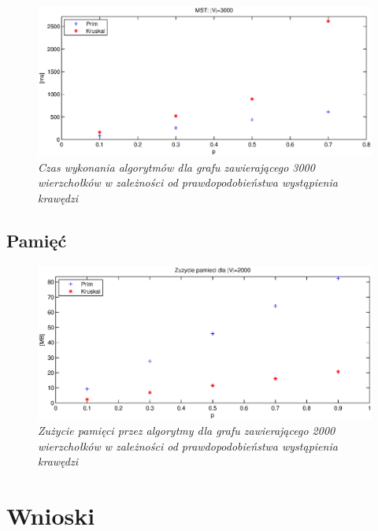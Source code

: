 \documentclass[a4paper, 10pt]{article}
\begin{document}
\begin{figure}[ht!]
\centering
\includegraphics[width=165mm]{wykresy/v3000.eps}
\caption{\it{Czas wykonania algorytmów dla grafu zawierającego 3000 wierzchołków w zależności od prawdopodobieństwa wystąpienia krawędzi}}
\label{overflow}
\end{figure}
\FloatBarrier

\subsection{Pamięć}

\begin{figure}[ht!]
\centering
\includegraphics[width=165mm]{wykresy/mem.eps}
\caption{\it{Zużycie pamięci przez algorytmy dla grafu zawierającego 2000 wierzchołków w zależności od prawdopodobieństwa wystąpienia krawędzi}}
\label{overflow}
\end{figure}
\FloatBarrier
\section{Wnioski}






	





\nocite{*}
\renewcommand\refname{\section{Bibliografia}}

\end{document}

